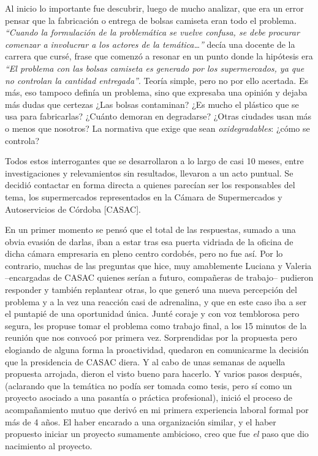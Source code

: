 \documentclass[
]{article}
\begin{document}
Al inicio lo importante fue descubrir, luego de mucho analizar, que era
un error pensar que la fabricación o entrega de bolsas camiseta eran
todo el problema\emph{.} \emph{``Cuando la formulación de la
problemática se vuelve confusa, se debe procurar comenzar a involucrar a
los actores de la temática\ldots{}''} decía una docente de la carrera
que cursé, frase que comenzó a resonar en un punto donde la hipótesis
era \emph{``El problema con las bolsas camiseta es generado por los
supermercados, ya que no controlan la cantidad entregada''}. Teoría
simple, pero no por ello acertada. Es más, eso tampoco definía un
problema, sino que expresaba una opinión y dejaba más dudas que certezas
¿Las bolsas contaminan? ¿Es mucho el plástico que se usa para
fabricarlas? ¿Cuánto demoran en degradarse? ¿Otras ciudades usan más o
menos que nosotros? La normativa que exige que sean
\emph{oxidegradables}: ¿cómo se controla?

Todos estos interrogantes que se desarrollaron a lo largo de casi 10
meses, entre investigaciones y relevamientos sin resultados, llevaron a
un acto puntual. Se decidió contactar en forma directa a quienes
parecían ser los responsables del tema, los supermercados representados
en la Cámara de Supermercados y Autoservicios de Córdoba {[}CASAC{]}.

En un primer momento se pensó que el total de las respuestas, sumado a
una obvia evasión de darlas, iban a estar tras esa puerta vidriada de la
oficina de dicha cámara empresaria en pleno centro cordobés, pero no fue
así. Por lo contrario, muchas de las preguntas que hice, muy amablemente
Luciana y Valeria --encargadas de CASAC quienes serían a futuro,
compañeras de trabajo-- pudieron responder y también replantear otras,
lo que generó una nueva percepción del problema y a la vez una reacción
casi de adrenalina, y que en este caso iba a ser el puntapié de una
oportunidad única. Junté coraje y con voz temblorosa pero segura, les
propuse tomar el problema como trabajo final, a los 15 minutos de la
reunión que nos convocó por primera vez. Sorprendidas por la propuesta
pero elogiando de alguna forma la proactividad, quedaron en comunicarme
la decisión que la presidencia de CASAC diera. Y al cabo de unas semanas
de aquella propuesta arrojada, dieron el visto bueno para hacerlo. Y
varios pasos después, (aclarando que la temática no podía ser tomada
como tesis, pero sí como un proyecto asociado a una pasantía o práctica
profesional), inició el proceso de acompañamiento mutuo que derivó en mi
primera experiencia laboral formal por más de 4 años. El haber encarado
a una organización similar, y el haber propuesto iniciar un proyecto
sumamente ambicioso, creo que fue \emph{el} paso que dio nacimiento al
proyecto.
\end{document}
